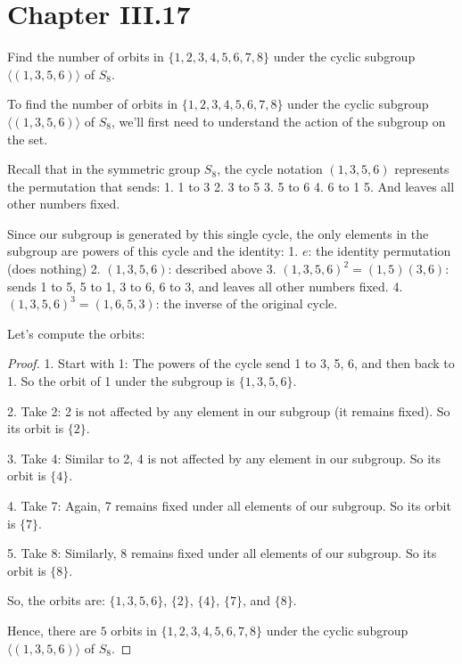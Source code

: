 \documentclass[12pt]{amsart}
\theoremstyle{definition}
\numberwithin{equation}{section}
\theoremstyle{plain}
\begin{document}
\section*{Chapter III.17}
\begin{exercise}{1} Find the number of orbits in $\{1, 2, 3, 4, 5, 6, 7, 8\}$ under the cyclic subgroup $\langle(1, 3, 5, 6)\rangle$ of $S_8$.
    
    To find the number of orbits in \(\{1, 2, 3, 4, 5, 6, 7, 8\}\) under the cyclic subgroup \(\langle(1, 3, 5, 6)\rangle\) of \(S_8\), we'll first need to understand the action of the subgroup on the set.

    Recall that in the symmetric group \(S_8\), the cycle notation \((1, 3, 5, 6)\) represents the permutation that sends:
    1. 1 to 3
    2. 3 to 5
    3. 5 to 6
    4. 6 to 1
    5. And leaves all other numbers fixed.
    
    Since our subgroup is generated by this single cycle, the only elements in the subgroup are powers of this cycle and the identity:
    1. \(e\): the identity permutation (does nothing)
    2. \((1, 3, 5, 6)\): described above
    3. \((1, 3, 5, 6)^2 = (1, 5)(3, 6)\): sends 1 to 5, 5 to 1, 3 to 6, 6 to 3, and leaves all other numbers fixed.
    4. \((1, 3, 5, 6)^3 = (1, 6, 5, 3)\): the inverse of the original cycle.
    
    Let's compute the orbits:
    
    \begin{proof}
    1. Start with 1: 
    The powers of the cycle send 1 to 3, 5, 6, and then back to 1. So the orbit of 1 under the subgroup is \(\{1, 3, 5, 6\}\).
    
    2. Take 2:
    2 is not affected by any element in our subgroup (it remains fixed). So its orbit is \(\{2\}\).
    
    3. Take 4:
    Similar to 2, 4 is not affected by any element in our subgroup. So its orbit is \(\{4\}\).
    
    4. Take 7:
    Again, 7 remains fixed under all elements of our subgroup. So its orbit is \(\{7\}\).
    
    5. Take 8:
    Similarly, 8 remains fixed under all elements of our subgroup. So its orbit is \(\{8\}\).
    
    So, the orbits are:
    \(\{1, 3, 5, 6\}\), \(\{2\}\), \(\{4\}\), \(\{7\}\), and \(\{8\}\).
    
    Hence, there are \(5\) orbits in \(\{1, 2, 3, 4, 5, 6, 7, 8\}\) under the cyclic subgroup \(\langle(1, 3, 5, 6)\rangle\) of \(S_8\).
    \end{proof}
\end{exercise}
\vspace*{20pt}
\end{document}
